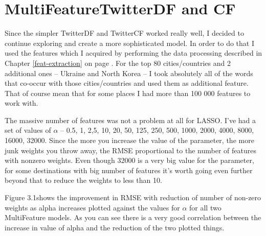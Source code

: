 \documentclass[minf,twoside,singlespacing,parskip,frontabs,notimes,11pt]{infthesis}
\begin{document}
\section{MultiFeatureTwitterDF and CF}
\label{sec:multi}

Since the simpler TwitterDF and TwitterCF worked really well, I decided to continue exploring and create a more sophisticated model. In order to do that I used the features which I acquired by performing the data processing described in Chapter \ref{feat-extraction} on page \pageref{feat-extraction}. For the top 80 cities/countries and 2 additional ones -- Ukraine and North Korea -- I took absolutely all of the words that co-occur with those cities/countries and used them as additional feature. That of course mean that for some places I had more than 100 000 features to work with. 


The massive number of features was not a problem at all for LASSO. I've had a set of values of $\alpha$ -- 0.5, 1, 2,5, 10, 20, 50, 125, 250, 500, 1000, 2000, 4000, 8000, 16000, 32000. Since the more you increase the value of the parameter, the more junk weights you throw away, the RMSE proportional to the number of features with nonzero weights. Even though 32000 is a very big value for the parameter, for some destinations with big number of features it's worth going even further beyond that to reduce the weights to less than 10.


Figure 3.1shows the improvement in RMSE with reduction of number of non-zero weights as alpha increases plotted against the values for $\alpha$ for all two MultiFeature models. As you can see there is a very good correlation between the increase in value of alpha and the reduction of the two plotted things. 
\end{document}
